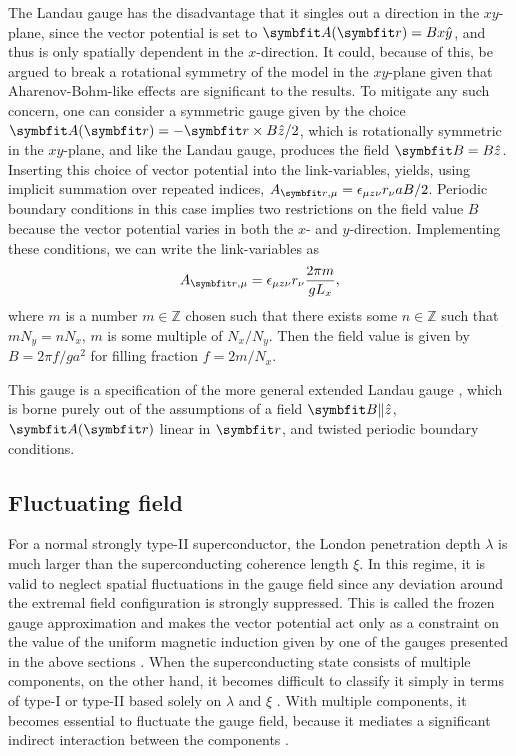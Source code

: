 The Landau gauge has the disadvantage that it singles out a direction in the $xy$-plane, since the vector potential is set to $\v{A}(\v{r})=Bx\hat{y}$, and thus is only spatially dependent
in the $x$-direction. It could, because of this, be argued to break a rotational symmetry of the model in the $xy$-plane given that Aharenov-Bohm-like effects are significant to the results.
To mitigate any such concern, one can consider a symmetric gauge given by the choice $\v{A}(\v{r}) = -\v{r}\times B\hat{z}/2$, which is rotationally symmetric in the $xy$-plane,
and like the Landau gauge, produces the field $\v{B} = B\hat{z}$.
Inserting this choice of vector potential into the link-variables, yields, using implicit summation over repeated indices,
$A_{\v{r},\mu} = \epsilon_{\mu z\nu}r_\nu aB/2$. Periodic boundary conditions in this case implies
two restrictions on the field value $B$ because the vector potential varies in both the $x$- and $y$-direction. Implementing these conditions, we can write the link-variables as
\begin{equation}
    \label{eq:LM:Field:symmGaugeLinks}
    A_{\v{r},\mu} = \epsilon_{\mu z\nu}r_\nu\frac{2\pi m}{gL_x},
\end{equation}
where $m$ is a number $m\in\mathbb{Z}$ chosen such that there exists some $n\in\mathbb{Z}$ such that $mN_y=nN_x$, \ie $m$ is some multiple of $N_x/N_y$.
Then the field value is given by $B = 2\pi f/ga^2$ for filling fraction $f=2m/N_x$.

This gauge is a specification of the more general extended Landau gauge \cite{Nguyen99PRB,Nguyen99EPL}, which is borne purely out of the assumptions of a field $\v{B}\|\hat{z}$,
$\v{A}(\v{r})$ linear in $\v{r}$, and
twisted periodic boundary conditions.

\subsection{Fluctuating field}

For a normal strongly type-II superconductor, the London penetration depth $\lambda$ is much larger than the superconducting coherence length $\xi$. In this regime, it is valid to neglect
spatial fluctuations in the gauge field since any deviation around the extremal field configuration is strongly suppressed. This is called the frozen gauge approximation and
makes the vector potential act only as a constraint on the value of the uniform magnetic induction given by one of the gauges presented in the above sections \cite{Nguyen99PRB}.
When the superconducting state consists of multiple components, on the other hand, it becomes difficult to classify it simply in terms of type-I or type-II based solely on
$\lambda$ and $\xi$ \cite{Babaev05}.
With multiple components, it becomes essential to fluctuate the gauge field, because it mediates a significant indirect interaction between the components \cite{Smorgrav05, Smiseth04}.

